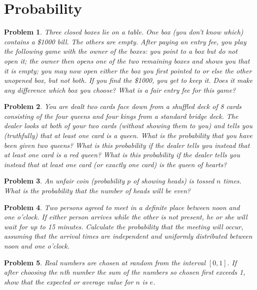 \documentclass[12pt]{article}
\newtheorem{problem}{Problem}
\begin{document}
\section*{Probability}

\begin{problem}
Three closed boxes lie on a table. One box (you don’t know which) contains a \$1000 bill.
The others are empty. After paying an entry fee, you play the following game with the owner
of the boxes: you point to a box but do not open it; the owner then opens one of the two
remaining boxes and shows you that it is empty; you may now open either the box you first
pointed to or else the other unopened box, but not both. If you find the \$1000, you get to
keep it. Does it make any difference which box you choose? What is a fair entry fee for this
game?
\end{problem}

\begin{problem}
You are dealt two cards face down from a shuffled deck of 8 cards consisting of the four
queens and four kings from a standard bridge deck. The dealer looks at both of your two
cards (without showing them to you) and tells you (truthfully) that at least one card is a
queen. What is the probability that you have been given two queens? What is this probability
if the dealer tells you instead that at least one card is a red queen? What is this probability if
the dealer tells you instead that at least one card (or exactly one card) is the queen of hearts?
\end{problem}

\begin{problem}
An unfair coin (probability $p$ of showing heads) is tossed $n$ times. What is the probability
that the number of heads will be even?
\end{problem}

\begin{problem}
Two persons agreed to meet in a definite place between noon and one o’clock. If either person
arrives while the other is not present, he or she will wait for up to 15 minutes. Calculate the
probability that the meeting will occur, assuming that the arrival times are independent and
uniformly distributed between noon and one o’clock.
\end{problem}

\begin{problem}
Real numbers are chosen at random from the interval $[0,1]$. If after choosing the $n$th number
the sum of the numbers so chosen first exceeds 1, show that the expected or average value
for $n$ is $e$.
\end{problem}
\end{document}
